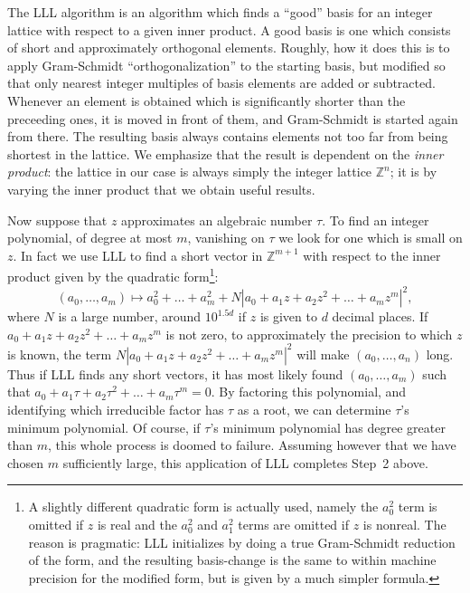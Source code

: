 \documentclass[a4paper]{amsart}
\def\Z{{\mathbb Z}}
\theoremstyle{definition}
\begin{document}
The LLL algorithm is an algorithm which finds a ``good'' basis for an 
integer lattice
with respect to a given inner product. A good basis is one which
consists of short and approximately orthogonal elements. 
Roughly, how it does this is
to apply Gram-Schmidt ``orthogonalization'' to the starting basis, 
but modified so that only nearest integer multiples of basis
elements are added or subtracted. 
Whenever
an element is obtained which is significantly shorter than the
preceeding ones, it is moved in front of them, and 
Gram-Schmidt is started again from there. 
The resulting basis always contains elements not too far from
being shortest in the lattice. We emphasize that the result is
dependent on the {\em inner product}: the lattice in our case is
always simply the integer lattice $\Z^n$; it is by varying the
inner product that we obtain useful results. 

Now suppose that $z$ approximates an algebraic number $\tau$. To find
an integer polynomial, of degree at most $m$, vanishing on $\tau$ we
look for one which is small on $z$. In fact we use LLL to find a short
vector in $\Z^{m+1}$ with respect to the inner product given by the
quadratic form\footnote{A slightly different
quadratic form is actually used, namely the $a_0^2$ term is omitted if
$z$ is real and the $a_0^2$ and $a_1^2$ terms are omitted if $z$ is
nonreal. The reason is pragmatic: LLL initializes by doing a
true Gram-Schmidt reduction of the form, and the resulting
basis-change is the same to within machine precision for the modified
form, but is given by a much simpler formula.}: 
$$ 
(a_0,\ldots,a_m) \mapsto a_0^2 + \ldots + a_m^2 + N
| a_0 + a_1 z + a_2 z^2 + \ldots + a_m z^m |^2, 
$$ 
where $N$ is a large number, around $10^{1.5 d}$ if $z$ is given to
$d$ decimal places. If $a_0 + a_1 z + a_2 z^2 + \ldots + a_m z^m$ is
not zero, to approximately the precision to which $z$ is known, the
term $N | a_0 + a_1 z + a_2 z^2 + \ldots + a_m z^m |^2$ will make
$(a_0,\ldots,a_n)$ long. Thus if LLL finds any short vectors,
it has most likely found $(a_0,\ldots,a_m)$ such that $a_0 + a_1 \tau + 
a_2 \tau^2 + \ldots + a_m \tau^m = 0$. By factoring this polynomial, 
and identifying which irreducible factor has
$\tau$ as a root, we can determine $\tau$'s minimum polynomial. 
Of course, if $\tau$'s
minimum polynomial has degree greater than $m$, this whole process is doomed
to failure. Assuming however that we have chosen $m$ sufficiently large, this
application of LLL completes Step~2 above. 
\end{document}

